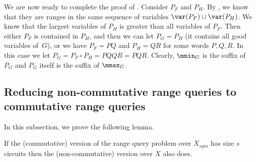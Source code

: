 \documentclass{toc}
\begin{document}
We are now ready to complete the proof of .
Consider $P_F$ and $P_H$. By  , we know that they are ranges in the same sequence of variables $\var(P_F)\cup \var(P_H)$. We know that the largest variables of $P_H$ is greater than all variables of $P_F$. Then either $P_F$ is contained in $P_H$, and then we can let $P_G=P_H$ (it contains all good variables of~$G$), or we have $P_F =PQ$ and $P_H=QR$ for some words $P, Q, R$. In this case we let $P_G = P_F \circ P_H = PQQR=PQR$. Clearly, $\mmin_G$ is the suffix of $P_G$ and $P_G$ itself is the suffix of $\mmax_G$.
%



\subsection{Reducing non-commutative range queries to commutative range queries} \label{sec:non-commutative_to_commutative}
%

In this subsection, we prove the following lemma.

\begin{lemma} \label{lem:intervals}
    If the (commutative) version of the
    range query
    problem over $X_{sym}$ has
    size $s$ circuits then the (non-commutative) version over $X$ also does.
\end{lemma}
\end{document}
